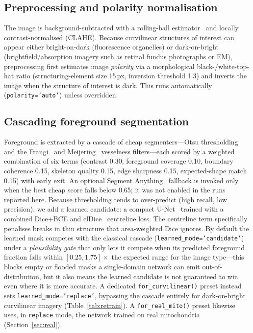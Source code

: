 \documentclass[10pt,a4paper]{article}
\begin{document}
\subsection{Preprocessing and polarity normalisation}
The image is background-subtracted with a rolling-ball estimator~\cite{ballpark}
and locally contrast-normalised (CLAHE). Because curvilinear structures of
interest can appear either bright-on-dark (fluorescence organelles) or
dark-on-bright (brightfield/absorption imagery such as retinal fundus
photographs or EM), preprocessing first estimates image \emph{polarity} via a
morphological black-/white-top-hat ratio (structuring-element size 15\,px,
inversion threshold 1.3) and inverts the image when the structure of interest
is dark. This runs automatically (\texttt{polarity='auto'}) unless overridden.

\subsection{Cascading foreground segmentation}
Foreground is extracted by a cascade of cheap segmenters---Otsu thresholding
and the Frangi~\cite{frangi} and Meijering~\cite{meijering} vesselness
filters---each scored by a weighted combination of six terms (contrast 0.30,
foreground coverage 0.10, boundary coherence 0.15, skeleton quality 0.15,
edge sharpness 0.15, expected-shape match 0.15) with early exit. An optional Segment Anything~\cite{sam} fallback is
invoked only when the best cheap score falls below 0.65; it was not enabled
in the runs reported here. Because thresholding
tends to over-predict (high recall, low precision), we add a learned
candidate: a compact U-Net~\cite{unet} trained with a combined Dice+BCE and
clDice~\cite{cldice} centreline loss. The centreline term specifically
penalises breaks in thin structure that area-weighted Dice ignores. By
default the learned mask competes with the classical cascade
(\texttt{learned\_mode='candidate'}) under a \emph{plausibility gate} that
only lets it compete when its predicted foreground fraction falls within
$[0.25,1.75]\times$ the expected range for the image type---this blocks
empty or flooded masks a single-domain network can emit out-of-distribution,
but it also means the learned candidate
is not guaranteed to win even where it is more accurate. A dedicated
\texttt{for\_curvilinear()} preset instead sets
\texttt{learned\_mode='replace'}, bypassing the cascade entirely for
dark-on-bright curvilinear imagery (Table~\ref{tab:retrain}). A \texttt{for\_real\_mito()} preset
likewise uses, in \texttt{replace} mode, the network trained on real
mitochondria (Section~\ref{sec:real}).
\end{document}
